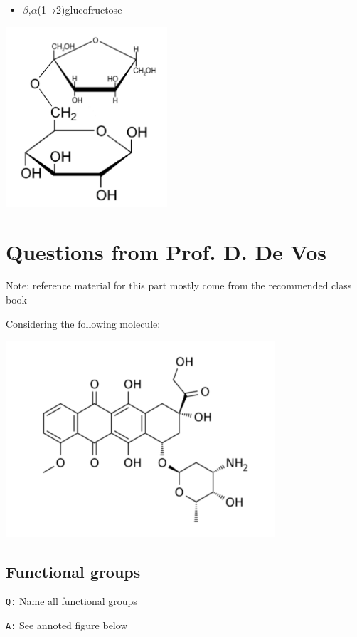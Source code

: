 \documentclass[11pt, a4paper,titlepage]{article}
\begin{document}
\begin{itemize}
\item $\beta$,$\alpha$(1→2)glucofructose
\end{itemize}

\includegraphics[width=6cm]{./Figures/BA(1-2)GlucoFructose2.pdf}
\section{Questions from Prof. D. De Vos}
\label{sec-3}

Note: reference material for this part mostly come from the
recommended class book \cite{BioChemBlei}

Considering the following molecule:

\includegraphics[width=10cm]{./Figures/Part3MoleculeRaw.pdf}
\subsection{Functional groups}
\label{sec-3-1}

\texttt{Q:} Name all functional groups

\texttt{A:} See annoted figure below
\end{document}
